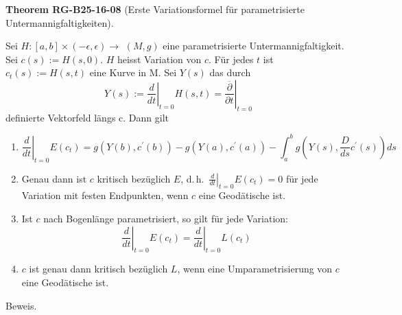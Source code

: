 \documentclass[10pt, letterpaper]{article}
\newcommand{\CustomHeading}[3]{%
  \par\medskip\noindent%
  \textbf{#1 #2} \textnormal{(#3)}.\enskip%
}
\newenvironment{THEO}[2]{\begin{unitbox}\CustomHeading{Theorem}{#1}{#2}}{\end{unitbox}}
\begin{document}
\begin{THEO}{RG-B25-16-08}{Erste Variationsformel für parametrisierte Untermannigfaltigkeiten}
Sei $H:[a, b] \times(-\epsilon, \epsilon) \rightarrow$ $(M, g)$ eine parametrisierte Untermannigfaltigkeit. Sei $c(s):=H(s, 0)$. $H$ heisst Variation von $c$. Für jedes $t$ ist $c_{t}(s):=H(s, t)$ eine Kurve in M. Sei $Y(s)$ das durch
$$
Y(s):=\left.\frac{d}{d t}\right|_{t=0} H(s, t)=\left.\overline{\frac{\partial}{\partial t}}\right|_{t=0}
$$
definierte Vektorfeld längs c. Dann gilt
\begin{enumerate}
  \item
  \[
  \left.\frac{d}{d t}\right|_{t=0} E\left(c_{t}\right) =
  g\left(Y(b), c^{\prime}(b)\right) - g\left(Y(a), c^{\prime}(a)\right)
  - \int_{a}^{b} g\left(Y(s), \frac{D}{d s} c^{\prime}(s)\right) d s
  \]

  \item Genau dann ist $c$ kritisch bezüglich $E$, d.\,h.\ $\left.\frac{d}{d t}\right|_{t=0} E(c_t) = 0$ für jede Variation mit festen Endpunkten, wenn $c$ eine Geodätische ist.

  \item Ist $c$ nach Bogenlänge parametrisiert, so gilt für jede Variation:
  \[
  \left.\frac{d}{d t}\right|_{t=0} E(c_t) = \left.\frac{d}{d t}\right|_{t=0} L(c_t)
  \]

  \item $c$ ist genau dann kritisch bezüglich $L$, wenn eine Umparametrisierung von $c$ eine Geodätische ist.
\end{enumerate}
\end{THEO}



Beweis. 
\end{document}
